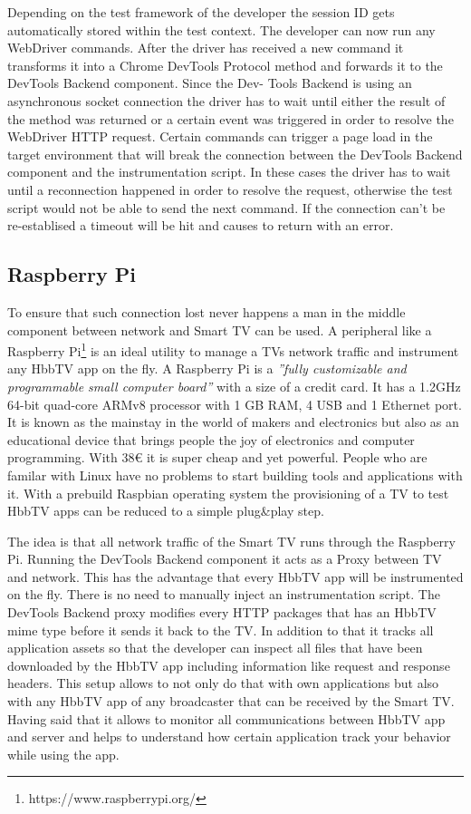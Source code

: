 Depending on the test framework of the developer the session ID gets automatically stored within the
test context. The developer can now run any WebDriver commands. After the driver has received a new
command it transforms it into a Chrome DevTools Protocol method and forwards it to the DevTools
Backend component. Since the Dev- Tools Backend is using an asynchronous socket connection the driver
has to wait until either the result of the method was returned or a certain event was triggered in
order to resolve the WebDriver HTTP request. Certain commands can trigger a page load in the target
environment that will break the connection between the DevTools Backend component and the instrumentation
script. In these cases the driver has to wait until a reconnection happened in order to resolve the
request, otherwise the test script would not be able to send the next command. If the connection can't
be re-establised a timeout will be hit and causes to return with an error.

\subsection{Raspberry Pi\label{sec:pi}}

To ensure that such connection lost never happens a man in the middle component between network and
Smart TV can be used. A peripheral like a Raspberry Pi\footnote{https://www.raspberrypi.org/} is
an ideal utility to manage a TVs network traffic and instrument any HbbTV app on the fly. A
Raspberry Pi is a \textit{''fully customizable and programmable small computer board''}\cite{raspberrypi}
with a size of a credit card. It has a 1.2GHz 64-bit quad-core ARMv8 processor with 1 GB RAM,
4 USB and 1 Ethernet port. It is known as the mainstay in the world of makers and electronics but
also as an educational device that brings people the joy of electronics and computer programming.
With 38\euro{} it is super cheap and yet powerful. People who are familar with Linux have no problems
to start building tools and applications with it. With a prebuild Raspbian operating system the
provisioning of a TV to test HbbTV apps can be reduced to a simple plug\&play step.

The idea is that all network traffic of the Smart TV runs through the Raspberry Pi. Running
the DevTools Backend component it acts as a Proxy between TV and network. This has the advantage
that every HbbTV app will be instrumented on the fly. There is no need to manually inject an
instrumentation script. The DevTools Backend proxy modifies every HTTP packages that has an HbbTV
mime type before it sends it back to the TV. In addition to that it tracks all application assets
so that the developer can inspect all files that have been downloaded by the HbbTV app including
information like request and response headers. This setup allows to not only do that with own
applications but also with any HbbTV app of any broadcaster that can be received by the Smart TV.
Having said that it allows to monitor all communications between HbbTV app and server and helps
to understand how certain application track your behavior while using the app.

